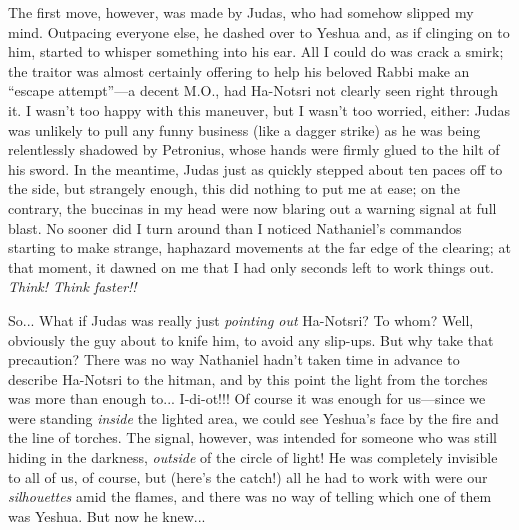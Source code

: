 The first move, however, was made by Judas, who had somehow slipped my mind. Outpacing everyone else, he dashed over to Yeshua and, as if clinging on to him, started to whisper something into his ear. All I could do was crack a smirk; the traitor was almost certainly offering to help his beloved Rabbi make an ``escape attempt''---a decent M.O., had Ha-Notsri not clearly seen right through it. I wasn't too happy with this maneuver, but I wasn't too worried, either: Judas was unlikely to pull any funny business (like a dagger strike) as he was being relentlessly shadowed by Petronius, whose hands were firmly glued to the hilt of his sword. In the meantime, Judas just as quickly stepped about ten paces off to the side, but strangely enough, this did nothing to put me at ease; on the contrary, the buccinas in my head were now blaring out a warning signal at full blast. No sooner did I turn around than I noticed Nathaniel's commandos starting to make strange, haphazard movements at the far edge of the clearing; at that moment, it dawned on me that I had only seconds left to work things out. \emph{Think! Think faster!!}

So... What if Judas was really just \emph{pointing out} Ha-Notsri? To whom? Well, obviously the guy about to knife him, to avoid any slip-ups. But why take that precaution? There was no way Nathaniel hadn't taken time in advance to describe Ha-Notsri to the hitman, and by this point the light from the torches was more than enough to... I-di-ot!!! Of course it was enough for us---since we were standing \emph{inside} the lighted area, we could see Yeshua's face by the fire and the line of torches. The signal, however, was intended for someone who was still hiding in the darkness, \emph{outside} of the circle of light! He was completely invisible to all of us, of course, but (here's the catch!) all he had to work with were our \emph{silhouettes} amid the flames, and there was no way of telling which one of them was Yeshua. But now he knew...

